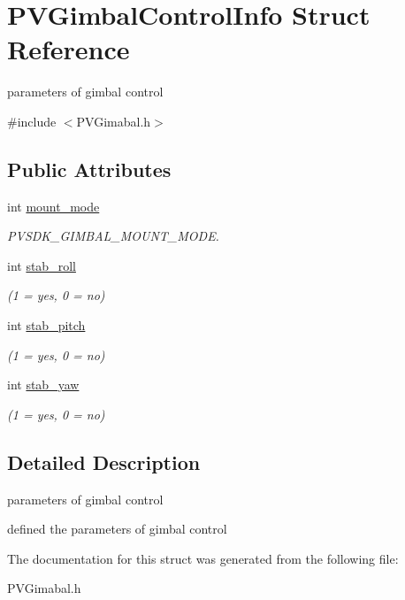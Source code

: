 \hypertarget{struct_p_v_gimbal_control_info}{}\section{P\+V\+Gimbal\+Control\+Info Struct Reference}
\label{struct_p_v_gimbal_control_info}


parameters of gimbal control  




{\ttfamily \#include $<$P\+V\+Gimabal.\+h$>$}

\subsection*{Public Attributes}
\begin{DoxyCompactItemize}
\item 
\mbox{\label{struct_p_v_gimbal_control_info_a7ebe15fe4ac099e91cbd7c897d6db736}} 
int \hyperlink{struct_p_v_gimbal_control_info_a7ebe15fe4ac099e91cbd7c897d6db736}{mount\+\_\+mode}
\begin{DoxyCompactList}\small\item\em P\+V\+S\+D\+K\+\_\+\+G\+I\+M\+B\+A\+L\+\_\+\+M\+O\+U\+N\+T\+\_\+\+M\+O\+DE. \end{DoxyCompactList}\item 
\mbox{\label{struct_p_v_gimbal_control_info_a6c296bd2af3812ac0d6243e0aa7820e9}} 
int \hyperlink{struct_p_v_gimbal_control_info_a6c296bd2af3812ac0d6243e0aa7820e9}{stab\+\_\+roll}
\begin{DoxyCompactList}\small\item\em (1 = yes, 0 = no) \end{DoxyCompactList}\item 
\mbox{\label{struct_p_v_gimbal_control_info_a8040d73b2f6316a61da79a287b3b8834}} 
int \hyperlink{struct_p_v_gimbal_control_info_a8040d73b2f6316a61da79a287b3b8834}{stab\+\_\+pitch}
\begin{DoxyCompactList}\small\item\em (1 = yes, 0 = no) \end{DoxyCompactList}\item 
\mbox{\label{struct_p_v_gimbal_control_info_a3f1d390dce1cae47c2d82af9a7134421}} 
int \hyperlink{struct_p_v_gimbal_control_info_a3f1d390dce1cae47c2d82af9a7134421}{stab\+\_\+yaw}
\begin{DoxyCompactList}\small\item\em (1 = yes, 0 = no) \end{DoxyCompactList}\end{DoxyCompactItemize}


\subsection{Detailed Description}
parameters of gimbal control 

defined the parameters of gimbal control 

The documentation for this struct was generated from the following file\+:\begin{DoxyCompactItemize}
\item 
P\+V\+Gimabal.\+h\end{DoxyCompactItemize}
